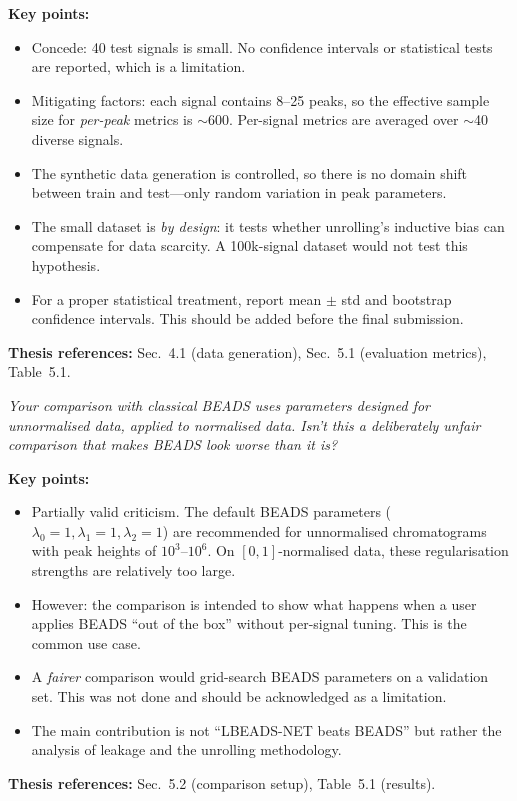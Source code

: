 \documentclass[11pt, letterpaper]{article}
\newcounter{qcounter}
\newcommand{\question}[1]{%
  \stepcounter{qcounter}%
  \begin{questionbox}[Q\theqcounter]%
    \itshape #1%
  \end{questionbox}%
}
\begin{document}
\begin{answerbox}
\textbf{Key points:}
\begin{itemize}[nosep]
  \item Concede: 40 test signals is small.  No confidence intervals
        or statistical tests are reported, which is a limitation.
  \item Mitigating factors: each signal contains 8--25 peaks, so the
        effective sample size for \emph{per-peak} metrics is $\sim$600.
        Per-signal metrics are averaged over $\sim$40 diverse signals.
  \item The synthetic data generation is controlled, so there is no
        domain shift between train and test---only random variation
        in peak parameters.
  \item The small dataset is \emph{by design}: it tests whether
        unrolling's inductive bias can compensate for data scarcity.
        A 100k-signal dataset would not test this hypothesis.
  \item For a proper statistical treatment, report mean $\pm$ std
        and bootstrap confidence intervals.  This should be added
        before the final submission.
\end{itemize}
\textbf{Thesis references:} Sec.~4.1 (data generation), Sec.~5.1 (evaluation metrics), Table~5.1.
\end{answerbox}

\question{Your comparison with classical BEADS uses parameters designed for
unnormalised data, applied to normalised data.  Isn't this a
deliberately unfair comparison that makes BEADS look worse than it
is?}

\begin{answerbox}
\textbf{Key points:}
\begin{itemize}[nosep]
  \item Partially valid criticism.  The default BEADS parameters
        ($\lambda_0{=}1, \lambda_1{=}1, \lambda_2{=}1$) are
        recommended for unnormalised chromatograms with peak heights
        of $10^3$--$10^6$.  On $[0,1]$-normalised data, these
        regularisation strengths are relatively too large.
  \item However: the comparison is intended to show what happens
        when a user applies BEADS ``out of the box'' without
        per-signal tuning.  This is the common use case.
  \item A \emph{fairer} comparison would grid-search BEADS parameters
        on a validation set.  This was not done and should be
        acknowledged as a limitation.
  \item The main contribution is not ``LBEADS-NET beats BEADS'' but
        rather the analysis of leakage and the unrolling methodology.
\end{itemize}
\textbf{Thesis references:} Sec.~5.2 (comparison setup), Table~5.1 (results).
\end{answerbox}
\end{document}
